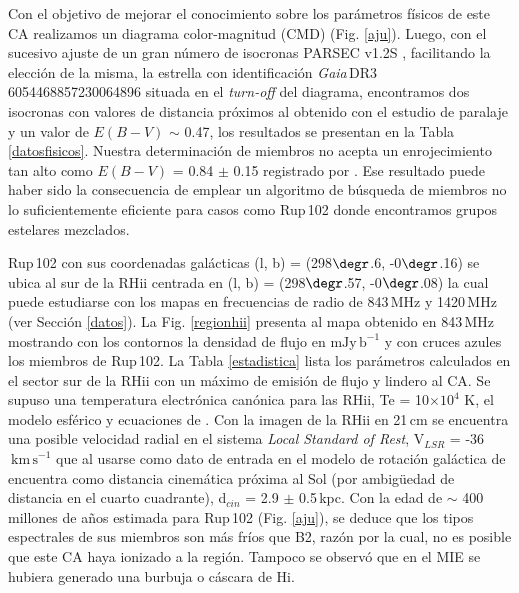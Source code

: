 \documentclass[baaa]{baaa}
\begin{document}
Con el objetivo de mejorar el conocimiento sobre los par\'ametros f\'isicos de este CA realizamos un diagrama color-magnitud (CMD) (Fig. \ref{aju}). Luego, con el sucesivo ajuste de un gran n\'umero de isocronas PARSEC v1.2S \citep{Bressan2012}, facilitando la elecci\'on de la misma, la estrella con identificaci\'on \emph{Gaia}\,DR3 6054468857230064896 situada en el {\em turn-off} del diagrama, encontramos dos isocronas con valores de distancia pr\'oximos al obtenido con el estudio de paralaje y un valor de $E(B-V)$ $\sim$ 0.47, los resultados se presentan en la Tabla \ref{datosfisicos}. Nuestra determinación de miembros no acepta un enrojecimiento tan alto como $E(B-V)$ = 0.84 $\pm$ 0.15 registrado por \citet{2019angelo}. Ese resultado puede haber sido la consecuencia de emplear \citet{2019angelo} un algoritmo de b\'usqueda de miembros no lo suficientemente eficiente para casos como Rup\,102 donde encontramos grupos estelares mezclados.

 Rup\,102 con sus coordenadas gal\'acticas (l, b) = (298$\degr$.6, -0$\degr$.16) se ubica al sur de la RH{\sc ii} centrada en (l, b) = (298$\degr$.57, -0$\degr$.08) la cual puede estudiarse con los mapas en frecuencias de radio de 843\,MHz y 1420\,MHz (ver Secci\'on \ref{datos}). La Fig. \ref{regionhii} presenta al mapa obtenido en 843\,MHz mostrando con los contornos la densidad de flujo en $\mathrm{mJy\,b}^{-1}$ y con cruces azules los miembros de Rup\,102. La Tabla \ref{estadistica} lista los par\'ametros calculados en el sector sur de la RH{\sc ii} con un m\'aximo de emisi\'on de flujo y lindero al CA. Se supuso una temperatura electr\'onica can\'onica para las RH{\sc ii}, Te = 10$\times10^4$ K, el modelo esf\'erico y ecuaciones de \citet{1967Mez}. Con la imagen de la RH{\sc ii} en 21\,cm se encuentra una posible velocidad radial en el sistema \emph{Local Standard of Rest}, V$_{LSR}$ = -36$~\mathrm{km\,s}^{-1}$ que al usarse como dato de entrada en el modelo de rotaci\'on gal\'actica de \citet{2018Wenger} encuentra como distancia cinem\'atica pr\'oxima al Sol (por ambig\"uedad de distancia en el cuarto cuadrante), d$_{cin}$ = 2.9 $\pm$ 0.5\,kpc. 
 Con la edad de $\sim$ 400 millones de a\~nos estimada para Rup\,102 (Fig. \ref{aju}), se deduce que 
 los tipos espectrales de sus miembros son m\'as fr\'ios que B2, razón por la cual, no es posible que este CA haya ionizado a la regi\'on. Tampoco se observ\'o que en el MIE se hubiera generado una burbuja o c\'ascara de H{\sc i}. 
 
\end{document}
